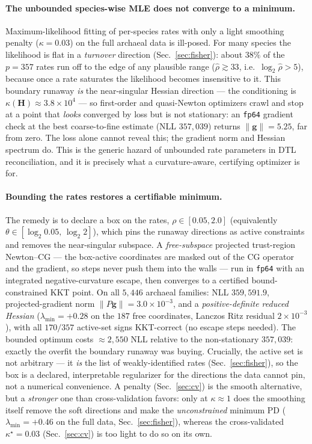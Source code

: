 \documentclass[11pt]{article}
\newcommand{\Hess}{\mathbf{H}}
\newcommand{\grad}{\mathbf{g}}
\begin{document}
\paragraph{The unbounded species-wise MLE does not converge to a minimum.}
Maximum-likelihood fitting of per-species rates with only a light smoothing
penalty ($\kappa{=}0.03$) on the full archaeal data is ill-posed. For many
species the likelihood is flat in a \emph{turnover} direction (Sec.~\ref{sec:fisher}):
about $38\%$ of the $p{=}357$ rates run off to the edge of any plausible range
($\hat\rho\gtrsim 33$, i.e.\ $\log_2\hat\rho>5$), because once a rate saturates
the likelihood becomes insensitive to it. This boundary runaway \emph{is} the
near-singular Hessian direction --- the conditioning is
$\kappa(\Hess)\!\approx\!3.8\!\times\!10^{4}$ --- so first-order and quasi-Newton
optimizers crawl and stop at a point that \emph{looks} converged by loss but is
not stationary: an \texttt{fp64} gradient check at the best coarse-to-fine
estimate (NLL $357{,}039$) returns $\|\grad\|=5.25$, far from zero. The loss
alone cannot reveal this; the gradient norm and Hessian spectrum do. This is the
generic hazard of unbounded rate parameters in DTL reconciliation, and it is
precisely what a curvature-aware, certifying optimizer is for.

\paragraph{Bounding the rates restores a certifiable minimum.}
The remedy is to declare a box on the rates, $\rho\in[0.05,2.0]$ (equivalently
$\theta\in[\log_2 0.05,\,\log_2 2]$), which pins the runaway directions as active
constraints and removes the near-singular subspace. A \emph{free-subspace}
projected trust-region Newton--CG --- the box-active coordinates are masked out
of the CG operator and the gradient, so steps never push them into the walls ---
run in \texttt{fp64} with an integrated negative-curvature escape, then converges
to a certified bound-constrained KKT point. On all $5{,}446$ archaeal families:
NLL $359{,}591.9$, projected-gradient norm $\|P\grad\|=3.0\!\times\!10^{-3}$, and
a \emph{positive-definite reduced Hessian} ($\lambda_{\min}=+0.28$ on the $187$
free coordinates, Lanczos Ritz residual $2\!\times\!10^{-3}$), with all $170/357$
active-set signs KKT-correct (no escape steps needed). The bounded optimum costs
$\approx\!2{,}550$ NLL relative to the non-stationary $357{,}039$: exactly the
overfit the boundary runaway was buying. Crucially, the active set is not
arbitrary --- it \emph{is} the list of weakly-identified rates
(Sec.~\ref{sec:fisher}), so the box is a declared, interpretable regularizer for
the directions the data cannot pin, not a numerical convenience. A penalty
(Sec.~\ref{sec:cv}) is the smooth alternative, but a \emph{stronger} one than
cross-validation favors: only at $\kappa\!\approx\!1$ does the smoothing itself
remove the soft directions and make the \emph{unconstrained} minimum PD
($\lambda_{\min}=+0.46$ on the full data, Sec.~\ref{sec:fisher}), whereas the
cross-validated $\kappa^\star{=}0.03$ (Sec.~\ref{sec:cv}) is too light to do so on its own.
\end{document}
